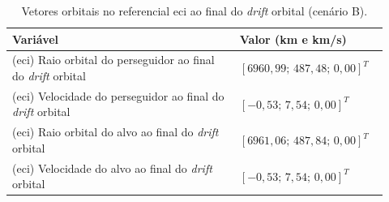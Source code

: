 \begin{table}[H]
\centering
\caption{Vetores orbitais no referencial \gls{eci} ao final do \emph{drift} orbital (cenário B).}
\label{tab_cap4_eciB_final}
\begingroup
\small
\setlength{\tabcolsep}{4pt}
\renewcommand{\arraystretch}{1.15}
\begin{tabular}{|p{0.58\linewidth}|p{0.34\linewidth}|}
\hline
Variável & Valor (km e km/s)\\
\hline
(\gls{eci}) Raio orbital do perseguidor ao final do \emph{drift} orbital &
$\left[6960,99;\,487,48;\,0,00\right]^T$\\
\hline
(\gls{eci}) Velocidade do perseguidor ao final do \emph{drift} orbital &
$\left[-0,53;\,7,54;\,0,00\right]^T$\\
\hline
(\gls{eci}) Raio orbital do alvo ao final do \emph{drift} orbital &
$\left[6961,06;\,487,84;\,0,00\right]^T$\\
\hline
(\gls{eci}) Velocidade do alvo ao final do \emph{drift} orbital &
$\left[-0,53;\,7,54;\,0,00\right]^T$\\
\hline
\end{tabular}
\endgroup
\end{table}

